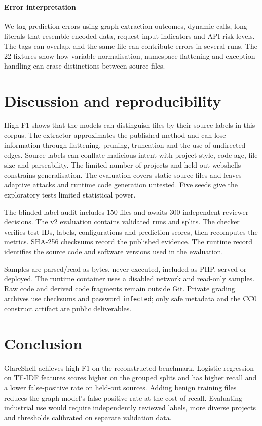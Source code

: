 \paragraph{Error interpretation}
We tag prediction errors using graph extraction outcomes, dynamic calls, long literals that resemble encoded
data, request-input indicators and API risk levels. The tags can overlap, and the same file can contribute
errors in several runs. The 22 fixtures show how variable normalisation, namespace flattening and exception
handling can erase distinctions between source files.

\section{Discussion and reproducibility}\label{sec:discussion}
High F1 shows that the models can distinguish files by their source labels in this corpus. The extractor
approximates the published method and can lose information through flattening, pruning, truncation and the
use of undirected edges. Source labels can conflate malicious intent with project style, code age, file size
and parseability. The limited number of projects and held-out webshells constrains generalisation. The
evaluation covers static source files and leaves adaptive attacks and runtime code generation untested.
Five seeds give the exploratory tests limited statistical power.

The blinded label audit includes 150 files and awaits 300 independent reviewer decisions. The v2 evaluation
contains  validated runs and  splits. The checker verifies test IDs,
labels, configurations and prediction scores, then recomputes the metrics. SHA-256 checksums record the
published evidence. The runtime record identifies the source code and software versions used in the evaluation.

Samples are parsed/read as bytes, never executed, included as PHP, served or deployed. The runtime container
uses a disabled network and read-only samples. Raw code and derived code fragments remain outside Git.
Private grading archives use checksums and password \texttt{infected}; only safe metadata and the CC0 construct
artifact are public deliverables.

\newpage
\section{Conclusion}\label{sec:conclusion}
GlareShell achieves high F1 on the reconstructed benchmark. Logistic regression on TF-IDF features scores
higher on the grouped splits and has higher recall and a lower false-positive rate on held-out sources.
Adding benign training files reduces the graph model's false-positive rate at the cost of recall. Evaluating
industrial use would require independently reviewed labels, more diverse projects and thresholds calibrated
on separate validation data.
